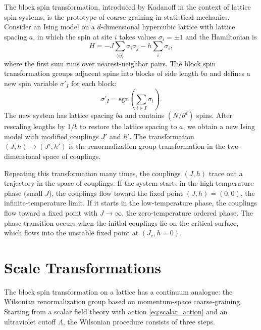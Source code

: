 \documentclass[11pt, twoside, openright]{book}
\theoremstyle{dotted}
\theoremstyle{definition}
\begin{document}
The block spin transformation, introduced by Kadanoff in the context of lattice spin
systems, is the prototype of coarse-graining in statistical mechanics. Consider an
Ising model on a $d$-dimensional hypercubic lattice with lattice spacing $a$,
in which the spin at site $i$ takes values $\sigma_i = \pm 1$ and the Hamiltonian is
\begin{equation}
  H = -J \sum_{\langle i j \rangle} \sigma_i \sigma_j - h \sum_i \sigma_i,
  \label{eq:ising}
\end{equation}
where the first sum runs over nearest-neighbor pairs. The block spin transformation
groups adjacent spins into blocks of side length $ba$ and defines a new spin
variable $\sigma'_I$ for each block:
\begin{equation}
  \sigma'_I = \text{sgn}\!\left(\sum_{i \in I} \sigma_i\right).
  \label{eq:block_spin}
\end{equation}
The new system has lattice spacing $ba$ and contains $(N/b^d)$ spins. After
rescaling lengths by $1/b$ to restore the lattice spacing to $a$, we obtain a new
Ising model with modified couplings $J'$ and $h'$. The transformation
$(J, h) \to (J', h')$ is the renormalization group transformation in the
two-dimensional space of couplings.

Repeating this transformation many times, the couplings $(J, h)$ trace out a
trajectory in the space of couplings. If the system starts in the high-temperature
phase (small $J$), the couplings flow toward the fixed point $(J, h) = (0, 0)$,
the infinite-temperature limit. If it starts in the low-temperature phase, the
couplings flow toward a fixed point with $J \to \infty$, the zero-temperature
ordered phase. The phase transition occurs when the initial couplings lie on the
critical surface, which flows into the unstable fixed point at $(J_c, h = 0)$.

\section{Scale Transformations}

The block spin transformation on a lattice has a continuum analogue: the Wilsonian
renormalization group based on momentum-space coarse-graining. Starting from a
scalar field theory with action \eqref{eq:scalar_action} and an ultraviolet cutoff
$\Lambda$, the Wilsonian procedure consists of three steps.
\end{document}
